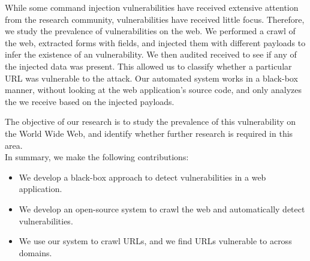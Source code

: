 While some command injection vulnerabilities have received extensive attention from the research community, \ehi vulnerabilities have received little focus. Therefore, we study the prevalence of \ehi vulnerabilities on the web. We performed a crawl of the web, extracted forms with \email fields, and injected them with different payloads to infer the existence of an \ehi vulnerability. We then audited received \emails to see if any of the injected data was present. This allowed us to classify whether a particular URL was vulnerable to the attack. Our automated system works in a black-box manner, without looking at the web application's source code, and only analyzes the \emails we receive based on the injected payloads.

The objective of our research is to study the prevalence of this vulnerability on the World Wide Web, and identify whether further research is required in this area.
\\

\noindent{}In summary, we make the following contributions:
\begin{itemize}

\item We develop a black-box approach to detect \ehi vulnerabilities in a web application.

\item We develop an open-source system to crawl the web and automatically detect \ehi vulnerabilities.

\item We use our system to crawl \urls URLs, and we find \success URLs vulnerable to \ehi across \domains domains. 

\end{itemize}
